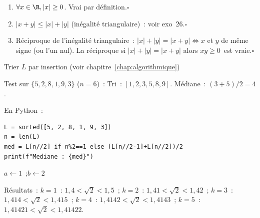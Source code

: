 
\begin{enumerate}
  \item $\forall x\in\R, |x|\geq0$. Vrai par d\'efinition.\hfill$\square$
  \item $|x+y|\leq|x|+|y|$ (in\'egalit\'e triangulaire)~: voir exo~26.\hfill$\square$
  \item R\'eciproque de l'in\'egalit\'e triangulaire~:
        $|x|+|y|=|x+y|\Leftrightarrow x$ et $y$ de m\^eme signe (ou l'un nul).
        La r\'eciproque \og si $|x|+|y|=|x+y|$ alors $xy\geq0$\fg\ est vraie.\hfill$\square$
\end{enumerate}


\begin{algorithm}[H]
\caption{Tri insertion + m\'ediane}
Trier $L$ par insertion (voir chapitre~\ref{chap:algorithmique})\;
\end{algorithm}

Test sur $\{5,2,8,1,9,3\}$ ($n=6$)~:
Tri~: $[1,2,3,5,8,9]$.
M\'ediane~: $(3+5)/2=4$.

En Python~:
\begin{lstlisting}[style=python]
L = sorted([5, 2, 8, 1, 9, 3])
n = len(L)
med = L[n//2] if n%2==1 else (L[n//2-1]+L[n//2])/2
print(f"Mediane : {med}")
\end{lstlisting}


\begin{algorithm}[H]
\caption{Encadrement de $\sqrt{2}$ \`a $10^{-k}$}
$a\leftarrow1$~;\quad $b\leftarrow2$\;
\end{algorithm}

R\'esultats~:
$k=1$~: $1{,}4<\sqrt{2}<1{,}5$~;
$k=2$~: $1{,}41<\sqrt{2}<1{,}42$~;
$k=3$~: $1{,}414<\sqrt{2}<1{,}415$~;
$k=4$~: $1{,}4142<\sqrt{2}<1{,}4143$~;
$k=5$~: $1{,}41421<\sqrt{2}<1{,}41422$.

